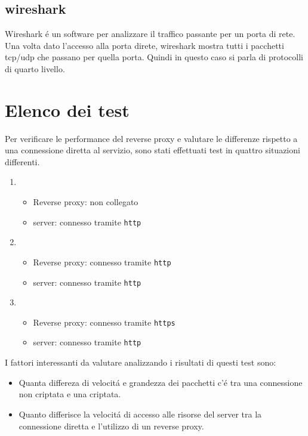 \subsection{wireshark}
\cite{wireshark}
Wireshark é un software per analizzare il traffico passante per un porta di rete. Una volta dato l'accesso alla porta direte, wireshark mostra tutti i pacchetti tcp/udp che passano per quella porta. Quindi in questo caso si parla di protocolli di quarto livello.

\section{Elenco dei test}\label{test:settings}
Per verificare le performance del reverse proxy e valutare le differenze rispetto a una connessione diretta al servizio, sono stati effettuati test in quattro situazioni differenti.
\begin{enumerate}
  \item
    \begin{itemize}
      \item Reverse proxy: non collegato
      \item server: connesso tramite \texttt{http}
    \end{itemize}
  \item
    \begin{itemize}
      \item Reverse proxy: connesso tramite \texttt{http}
      \item server: connesso tramite \texttt{http}
    \end{itemize}
  \item
    \begin{itemize}
      \item Reverse proxy: connesso tramite \texttt{https}
      \item server: connesso tramite \texttt{http}
    \end{itemize}
\end{enumerate}
I fattori interessanti da valutare analizzando i risultati di questi test sono:
\begin{itemize}
  \item Quanta differeza di velocitá e grandezza dei pacchetti c'é tra una connessione non criptata e una criptata.
  \item Quanto differisce la velocitá di accesso alle risorse del server tra la connessione diretta e l'utilizzo di un reverse proxy.
\end{itemize}

